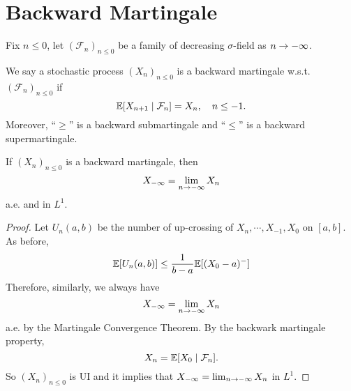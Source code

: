 \section{Backward Martingale}

Fix $n \leq 0$, let $(\mathcal{F}_n)_{n \leq 0}$ be a family of decreasing $\sigma$-field as $n \rightarrow -\infty$.

\begin{defn}
    We say a stochastic process $(X_n)_{n \leq 0}$ is a backward martingale w.s.t. $(\mathcal{F}_n)_{n \leq 0}$ if
    \begin{equation*}
        \mathbb{E}[X_{n+1} \mid \mathcal{F}_n] = X_n,\quad n\leq -1.
    \end{equation*}
    Moreover, ``$\geq$'' is a backward submartingale and ``$\leq$'' is a backward supermartingale.
\end{defn}


\begin{thm}
    If $(X_n)_{n \leq 0}$ is a backward martingale, then
    \begin{equation*}
        X_{-\infty} = \lim_{n \rightarrow -\infty}X_n
    \end{equation*}
    a.e. and in $L^1$.
\end{thm}
\begin{proof}
    Let $U_n(a,b)$ be the number of up-crossing of $X_{n},\cdots,X_{-1},X_0$ on $[a,b]$. As before,
    \begin{equation*}
        \mathbb{E}[U_n(a,b)] \leq \frac{1}{b - a}\mathbb{E}[(X_0 - a)^-]
    \end{equation*}
    Therefore, similarly, we always have
    \begin{equation*}
        X_{-\infty} = \lim_{n \rightarrow -\infty}X_n
    \end{equation*}
    a.e. by the Martingale Convergence Theorem. By the backwark martingale property,
    \begin{equation*}
        X_n = \mathbb{E}[X_0 \mid \mathcal{F}_n].
    \end{equation*}
    So $(X_n)_{n \leq 0}$ is UI and it implies that $X_{-\infty} = \lim_{n \rightarrow -\infty}X_n$ in $L^1$.
\end{proof}

